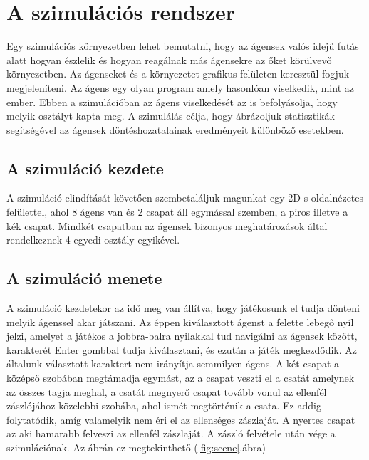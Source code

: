 




\section{A szimulációs rendszer}

Egy szimulációs környezetben lehet bemutatni, hogy az ágensek valós idejű futás alatt hogyan észlelik és hogyan reagálnak más ágensekre az őket körülvevő környezetben. Az ágenseket és a környezetet grafikus felületen keresztül fogjuk megjeleníteni. Az ágens egy olyan program amely hasonlóan viselkedik, mint az ember. Ebben a szimulációban az ágens viselkedését az is befolyásolja, hogy melyik osztályt kapta meg. A szimulálás célja, hogy ábrázoljuk statisztikák segítségével az ágensek döntéshozatalainak eredményeit különböző esetekben.

\subsection{A szimuláció kezdete}

A szimuláció elindítását követően  szembetaláljuk magunkat egy 2D-s oldalnézetes felülettel, ahol  8 ágens van és 2 csapat áll egymással szemben, a piros illetve a kék csapat. Mindkét csapatban az ágensek bizonyos meghatározások által rendelkeznek 4 egyedi osztály egyikével.

\subsection{A szimuláció menete}

A szimuláció kezdetekor az idő meg van állítva, hogy játékosunk el tudja dönteni melyik ágenssel akar játszani. Az éppen kiválasztott ágenst a felette lebegő nyíl jelzi, amelyet a játékos a jobbra-balra nyilakkal tud navigálni az ágensek között, karakterét Enter gombbal tudja kiválasztani, és ezután a játék megkezdődik. Az általunk választott karaktert nem irányítja semmilyen ágens. A két csapat a középső szobában megtámadja egymást, az a csapat veszti el a csatát amelynek az összes tagja meghal, a csatát megnyerő csapat tovább vonul az ellenfél zászlójához közelebbi szobába, ahol ismét megtörténik a csata. Ez addig folytatódik, amíg valamelyik nem éri el az ellenséges zászlaját. A nyertes csapat az aki hamarabb felveszi az ellenfél zászlaját. A zászló felvétele után vége a szimulációnak. Az ábrán ez megtekinthető (\ref{fig:scene}.ábra)

